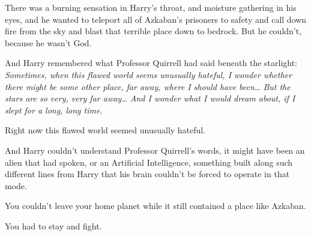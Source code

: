 There was a burning sensation in Harry's throat, and moisture gathering in his 
eyes, and he wanted to teleport all of Azkaban's prisoners to safety and call 
down fire from the sky and blast that terrible place down to bedrock. But he 
couldn't, because he wasn't God.

And Harry remembered what Professor Quirrell had said beneath the starlight: 
\emph{Sometimes, when this flawed world seems unusually hateful, I wonder 
whether there might be some other place, far away, where I should have 
been{\ldots} But the stars are so very, very far away{\ldots} And I wonder what 
I would dream about, if I slept for a long, long time.}

Right now this flawed world seemed unusually hateful.

And Harry couldn't understand Professor Quirrell's words, it might have been an 
alien that had spoken, or an Artificial Intelligence, something built along 
such different lines from Harry that his brain couldn't be forced to operate in 
that mode.

You couldn't leave your home planet while it still contained a place like 
Azkaban.

You had to stay and fight.